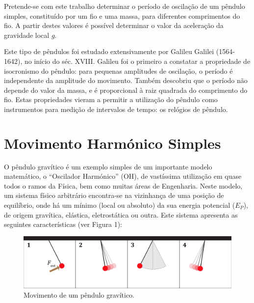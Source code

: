\documentclass[a4paper,twoside,12pt]{article}      %
\begin{document}
Pretende-se com este trabalho determinar o período de oscilação de um pêndulo simples, constituído por um fio e uma massa, para diferentes comprimentos do fio. A partir destes valores é possível determinar o valor da aceleração da gravidade local $g$.

Este tipo de pêndulos foi estudado extensivamente por Galileu Galilei (1564-1642), no início do séc. XVIII. Galileu foi o primeiro a constatar a propriedade de isocronismo do pêndulo: para pequenas amplitudes de oscilação, o período é independente da amplitude do movimento. Também descobriu que o período não depende do valor da massa, e é proporcional à raiz quadrada do comprimento do fio. Estas propriedades vieram a permitir a utilização do pêndulo como instrumentos para medição de intervalos de tempo: os relógios de pêndulo.


\section{\sf Movimento Harmónico Simples}

O pêndulo gravítico é um exemplo simples de um importante modelo matemático, o ``Oscilador Harmónico'' (OH), de vastíssima utilização em quase todos o ramos da Física,
 bem como muitas áreas de Engenharia. 
 Neste modelo, um sistema físico arbitrário encontra-se na vizinhança de uma posição de equilíbrio, onde há um mínimo (local ou absoluto) da sua energia potencial  ($E_P$), de origem gravítica, elástica, eletrostática ou outra. Este sistema apresenta as seguintes características (ver Figura 1):

\begin{figure}
	[b] \centering 
	\includegraphics[width=0.9	\textwidth]{Fig-1} 
	\caption{Movimento de um pêndulo gravítico.  \label{fig:1}} 
\end{figure}
 
\end{document}
